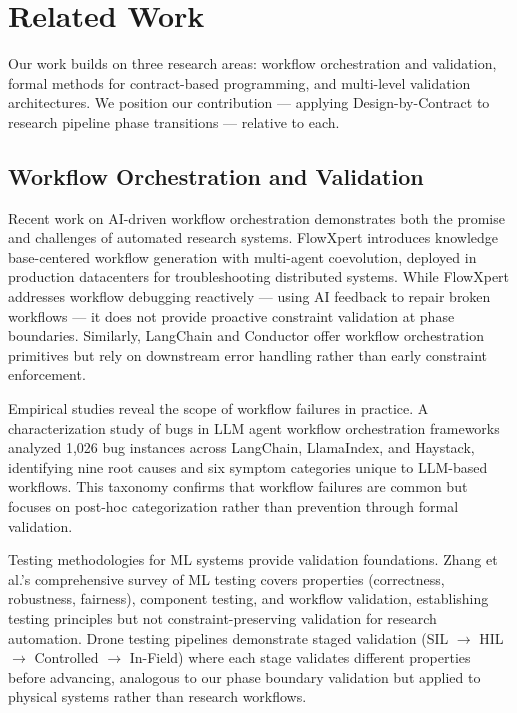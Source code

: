 \section{Related Work}

Our work builds on three research areas: workflow orchestration and validation, formal methods for contract-based programming, and multi-level validation architectures. We position our contribution --- applying Design-by-Contract to research pipeline phase transitions --- relative to each.

\subsection{Workflow Orchestration and Validation}

Recent work on AI-driven workflow orchestration demonstrates both the promise and challenges of automated research systems. FlowXpert introduces knowledge base-centered workflow generation with multi-agent coevolution, deployed in production datacenters for troubleshooting distributed systems. While FlowXpert addresses workflow debugging reactively --- using AI feedback to repair broken workflows --- it does not provide proactive constraint validation at phase boundaries. Similarly, LangChain and Conductor offer workflow orchestration primitives but rely on downstream error handling rather than early constraint enforcement.

Empirical studies reveal the scope of workflow failures in practice. A characterization study of bugs in LLM agent workflow orchestration frameworks analyzed 1,026 bug instances across LangChain, LlamaIndex, and Haystack, identifying nine root causes and six symptom categories unique to LLM-based workflows. This taxonomy confirms that workflow failures are common but focuses on post-hoc categorization rather than prevention through formal validation.

Testing methodologies for ML systems provide validation foundations. Zhang et al.'s comprehensive survey of ML testing covers properties (correctness, robustness, fairness), component testing, and workflow validation, establishing testing principles but not constraint-preserving validation for research automation. Drone testing pipelines demonstrate staged validation (SIL $\rightarrow$ HIL $\rightarrow$ Controlled $\rightarrow$ In-Field) where each stage validates different properties before advancing, analogous to our phase boundary validation but applied to physical systems rather than research workflows.

